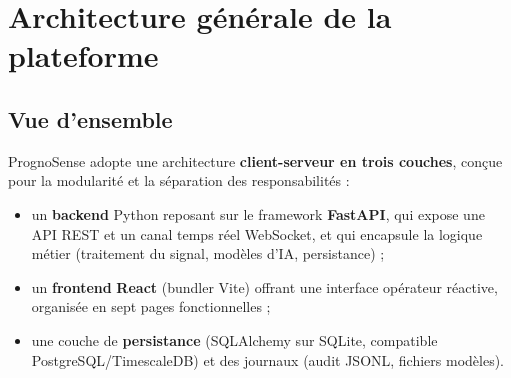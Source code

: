 \chapter{Architecture générale de la plateforme}
\label{chap:archi}

\section{Vue d'ensemble}
PrognoSense adopte une architecture \textbf{client-serveur en trois couches}, conçue pour
la modularité et la séparation des responsabilités :
\begin{itemize}[leftmargin=1.5em]
  \item un \textbf{backend} Python reposant sur le framework \textbf{FastAPI}, qui expose
        une API REST et un canal temps réel WebSocket, et qui encapsule la logique métier
        (traitement du signal, modèles d'IA, persistance) ;
  \item un \textbf{frontend} \textbf{React} (bundler Vite) offrant une interface
        opérateur réactive, organisée en sept pages fonctionnelles ;
  \item une couche de \textbf{persistance} (SQLAlchemy sur SQLite, compatible
        PostgreSQL/TimescaleDB) et des journaux (audit JSONL, fichiers modèles).
\end{itemize}

